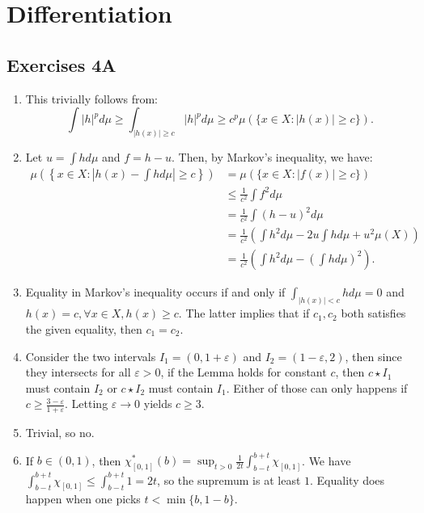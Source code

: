 \chapter{Differentiation} %
\label{chap:Differentiation}

\section{Exercises 4A} %
\label{sec:Exercises 4A}
\begin{enumerate}[label=\textbf{4A.\arabic*}]
  \item This trivially follows from:
    \[
      \int |h|^{p}d\mu \ge \int _{|h(x)| \ge c} |h|^{p}d\mu \ge c^{p}\mu (\{x \in
      X: |h(x)|\ge c\}  )
    .\] 
  \item Let \( u = \int hd\mu \) and \( f = h - u \). Then, by Markov's
    inequality, we have:
    \begin{align*}
      \mu \left( \left\{ x \in X: \left| h(x)-\int hd\mu \right| \ge c  \right\}
      \right) &= \mu (\{x \in X: |f(x)| \ge c \}  ) \\
              &\le \frac{1}{c ^2}\int f^2d\mu\\
              &= \frac{1}{c ^2} \int (h - u)^2d\mu \\
              &= \frac{1}{c ^2} \left( \int h^2d\mu - 2u\int hd\mu + u^2\mu (X) \right)  \\
              &= \frac{1}{c ^2} \left( \int h^2d\mu - \left( \int hd\mu  \right)
              ^2\right)
    .\end{align*}
  \item Equality in Markov's inequality occurs if and only if \( \int
    _{|h(x)|<c} hd\mu = 0 \) and \( h(x) = c, \forall x \in X, h(x) \ge c \).
    The latter implies that if \( c_{1}, c_{2} \) both satisfies the given
    equality, then \( c_{1} = c_{2} \).
  \item Consider the two intervals \( I_{1} = (0, 1 + \varepsilon) \) and \(
    I_{2} = (1 - \varepsilon, 2) \), then since they intersects for all \(
    \varepsilon > 0 \), if the Lemma holds for constant \( c \), then \( c \star
    I_{1}\) must contain \( I_{2} \) or \( c \star I_{2} \) must contain \(
    I_{1} \). Either of those can only happens if \( c \ge
    \frac{3-\varepsilon}{1+\varepsilon} \). Letting \( \varepsilon \to 0 \)
    yields \( c \ge 3 \).
  \item Trivial, so no.
  \item If \( b \in (0, 1) \), then \( \chi_{[0, 1]}^{*}(b) = \sup _{t > 0}
    \frac{1}{2t} \int _{b-t}^{b+t} \chi_{[0, 1]} \). We have \( \int
    _{b-t}^{b+t} \chi_{[0, 1]} \le \int _{b-t}^{b+t} 1 = 2t \), so the supremum
    is at least \( 1 \). Equality does happen when one picks \( t < \min \{b,
    1-b\}   \).


\end{enumerate}

